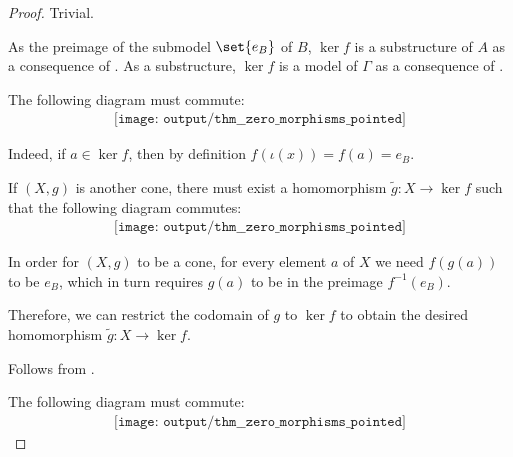\begin{proof}
   Trivial.


   As the preimage of the submodel \( \set{ e_B } \) of \( B \), \( \ker f \) is a substructure of \( A \) as a consequence of . As a substructure, \( \ker f \) is a model of \( \Gamma \) as a consequence of .

   The following diagram must commute:
  \begin{equation*}
    \begin{aligned}
      \texttt{[image: output/thm\_\_zero\_morphisms\_pointed]}
    \end{aligned}
  \end{equation*}

  Indeed, if \( a \in \ker f \), then by definition \( f(\iota(x)) = f(a) = e_B \).

   If \( (X, g) \) is another cone, there must exist a homomorphism \( \widetilde g: X \to \ker f \) such that the following diagram commutes:
  \begin{equation*}
    \begin{aligned}
      \texttt{[image: output/thm\_\_zero\_morphisms\_pointed]}
    \end{aligned}
  \end{equation*}

  In order for \( (X, g) \) to be a cone, for every element \( a \) of \( X \) we need \( f(g(a)) \) to be \( e_B \), which in turn requires \( g(a) \) to be in the preimage \( f^{-1}(e_B) \).

  Therefore, we can restrict the codomain of \( g \) to \( \ker f \) to obtain the desired homomorphism \( \widetilde g: X \to \ker f \).


   Follows from .

   The following diagram must commute:
  \begin{equation*}
    \begin{aligned}
      \texttt{[image: output/thm\_\_zero\_morphisms\_pointed]}
    \end{aligned}
  \end{equation*}


\end{proof}
